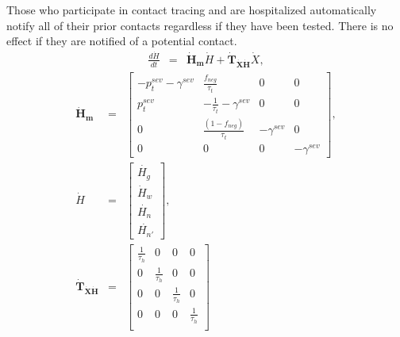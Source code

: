 \documentclass[notitlepage, superscriptaddress]{revtex4-2}
\begin{document}
Those who participate in contact tracing and are hospitalized automatically notify all of their prior contacts regardless if they have been tested. There is no effect if they are notified of a potential contact.
\begin{eqnarray}
\frac{d\dot{H}}{dt} &=& \boldsymbol{\dot{H}_{m}}  \dot{H} + \boldsymbol{\dot{T}_{\dot{X}\dot{H}}}  \dot{X}, 
\end{eqnarray}
%
\begin{eqnarray}
\boldsymbol{\dot{H}_{m}} &=&
\begin{bmatrix}
 - p^{sev}_{t} - \gamma^{sev} & \frac{f_{neg}}{\tau_{t}}  & 0 & 0 \\
p^{sev}_{t}  & -\frac{1}{\tau_{t}} - \gamma^{sev}      &  0    & 0  \\
 0 & \frac{(1-f_{neg})}{\tau_{t}}  & - \gamma^{sev}  & 0 \\ 
0 & 0 & 0 & - \gamma^{sev}
\end{bmatrix}, \\ 
%
\dot{H} &=& 
\begin{bmatrix}
\dot{H_{g}} \\  \dot{H}_{w}\\ \dot{H_{n}} \\ \dot{H_{n'}}
\end{bmatrix}, \\ 
%
\boldsymbol{\dot{T}_{\dot{X}\dot{H}}} &=&
\begin{bmatrix}
\frac{1}{\tau_{h}}  & 0 & 0 & 0 \\ 
0                         &  \frac{1}{\tau_{h}} & 0 & 0 \\ 
0                          &  0 & \frac{1}{\tau_{h}} & 0 \\ 
 0        & 0 & 0 & \frac{1}{\tau_{h}} \\ 
\end{bmatrix}
\end{eqnarray}
% 
\end{document}

